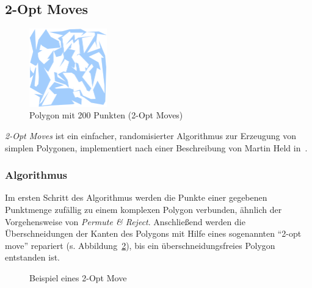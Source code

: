 \subsection{2-Opt Moves}

\begin{figure}[h]
\begin{center}
\includegraphics[width=0.3\textwidth]{img/2opt200.eps}
\end{center}
\caption{Polygon mit 200 Punkten (2-Opt Moves)}
\label{fig:2opt200}
\end{figure}

\emph{2-Opt Moves} ist ein einfacher, randomisierter Algorithmus zur Erzeugung von simplen Polygonen, implementiert nach einer Beschreibung von Martin Held in~\cite{held98polygons}. 
\subsubsection{Algorithmus}
Im ersten Schritt des Algorithmus werden die Punkte einer gegebenen Punktmenge zufällig zu einem komplexen Polygon verbunden, ähnlich der Vorgehensweise von \emph{Permute \& Reject}. Anschließend werden die Überschneidungen der Kanten des Polygons mit Hilfe eines sogenannten \enquote{2-opt move} repariert (s. Abbildung~\ref{fig:2optmove}), bis ein überschneidungsfreies Polygon entstanden ist.

\begin{figure}[h]
\begin{center}
\end{center}
\caption{Beispiel eines 2-Opt Move}
\label{fig:2optmove}
\end{figure}

